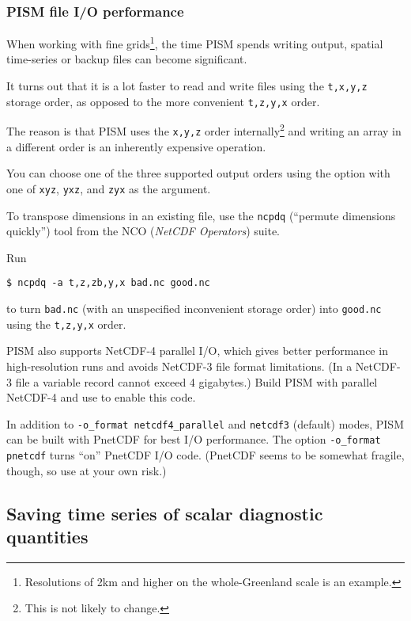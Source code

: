 \subsubsection{PISM file I/O performance}
\label{sec:pism-io-performance}

When working with fine grids\footnote{Resolutions of 2km and higher on the
  whole-Greenland scale is an example.}, the time PISM spends writing output,
spatial time-series or backup files can become significant.

It turns out that it is a lot faster to read and write files using the
\texttt{t,x,y,z} storage order, as opposed to the more convenient
\texttt{t,z,y,x} order.

The reason is that PISM uses the \texttt{x,y,z} order internally\footnote{This
  is not likely to change.} and writing an array in a different order is an
inherently expensive operation.

You can choose one of the three supported output orders using the
 option with one of \texttt{xyz}, \texttt{yxz}, and
\texttt{zyx} as the argument.

To transpose dimensions in an existing file, use the \texttt{ncpdq} (``permute
dimensions quickly'') tool from the NCO (\emph{NetCDF Operators}) suite.

Run
\begin{verbatim}
$ ncpdq -a t,z,zb,y,x bad.nc good.nc
\end{verbatim}%
to turn \texttt{bad.nc} (with an unspecified inconvenient storage order) into
\texttt{good.nc} using the \texttt{t,z,y,x} order.

PISM also supports NetCDF-4 parallel I/O, which gives better performance in
high-resolution runs and avoids NetCDF-3 file format limitations. (In a
NetCDF-3 file a variable record cannot exceed 4 gigabytes.) Build PISM with
parallel NetCDF-4 and use  to
enable this code.

In addition to \texttt{-o_format netcdf4_parallel} and \texttt{netcdf3}
(default) modes, PISM can be built with PnetCDF for best I/O performance. The
option \texttt{-o_format pnetcdf} turns ``on'' PnetCDF I/O code. (PnetCDF seems
to be somewhat fragile, though, so use at your own risk.)


\subsection{Saving time series of scalar diagnostic quantities}
\label{sec:saving-time-series}

